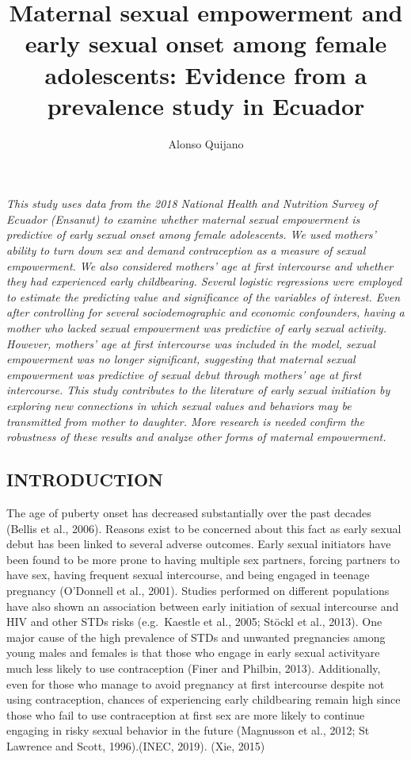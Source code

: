 \documentclass[
]{article}
\title{Maternal sexual empowerment and early sexual onset among female
adolescents: Evidence from a prevalence study in Ecuador}
\author{Alonso Quijano}
\date{}
\begin{document}
\maketitle

\emph{This study uses data from the 2018 National Health and Nutrition
Survey of Ecuador (Ensanut) to examine whether maternal sexual
empowerment is predictive of early sexual onset among female
adolescents. We used mothers' ability to turn down sex and demand
contraception as a measure of sexual empowerment. We also considered
mothers' age at first intercourse and whether they had experienced early
childbearing. Several logistic regressions were employed to estimate the
predicting value and significance of the variables of interest. Even
after controlling for several sociodemographic and economic confounders,
having a mother who lacked sexual empowerment was predictive of early
sexual activity. However, mothers' age at first intercourse was included
in the model, sexual empowerment was no longer significant, suggesting
that maternal sexual empowerment was predictive of sexual debut through
mothers' age at first intercourse. This study contributes to the
literature of early sexual initiation by exploring new connections in
which sexual values and behaviors may be transmitted from mother to
daughter. More research is needed confirm the robustness of these
results and analyze other forms of maternal empowerment.}

\hypertarget{introduction}{%
\subsection{INTRODUCTION}\label{introduction}}

The age of puberty onset has decreased substantially over the past
decades (Bellis et al., 2006). Reasons exist to be concerned about this
fact as early sexual debut has been linked to several adverse outcomes.
Early sexual initiators have been found to be more prone to having
multiple sex partners, forcing partners to have sex, having frequent
sexual intercourse, and being engaged in teenage pregnancy (O'Donnell et
al., 2001). Studies performed on different populations have also shown
an association between early initiation of sexual intercourse and HIV
and other STDs risks (e.g.~Kaestle et al., 2005; Stöckl et al., 2013).
One major cause of the high prevalence of STDs and unwanted pregnancies
among young males and females is that those who engage in early sexual
activityare much less likely to use contraception (Finer and Philbin,
2013). Additionally, even for those who manage to avoid pregnancy at
first intercourse despite not using contraception, chances of
experiencing early childbearing remain high since those who fail to use
contraception at first sex are more likely to continue engaging in risky
sexual behavior in the future (Magnusson et al., 2012; St Lawrence and
Scott, 1996).(INEC, 2019). (Xie, 2015)
\end{document}
